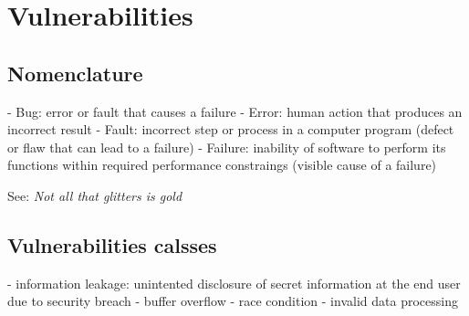 \chapter{Vulnerabilities}
\section{Nomenclature}
 - Bug: error or fault that causes a failure
 - Error: human action that produces an incorrect result
 - Fault: incorrect step or process in a computer program (defect or flaw that can lead to a failure)
 - Failure: inability of software to perform its functions within required performance constraings (visible cause of a failure)

See: \textit{Not all that glitters is gold}

\section{Vulnerabilities calsses}
 - information leakage: unintented disclosure of secret information at the end user due to security breach
 - buffer overflow
 - race condition
 - invalid data processing

 